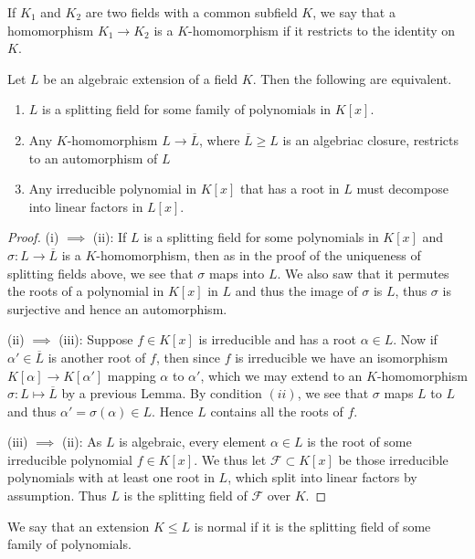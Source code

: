 \documentclass[twoside, a4paper, 10pt]{amsart}
\begin{document}
If $K_1$ and $K_2$ are two fields with a common subfield $K$, we say that a homomorphism $K_1 \to K_2$ is a $K$-homomorphism if it restricts to the identity on $K$.

\begin{thm} Let $L$ be an algebraic extension of a field $K$. Then the following are equivalent.

\begin{enumerate}
	\item $L$ is a splitting field for some family of polynomials in $K[x]$.
	\item Any $K$-homomorphism $L \to \overline{L}$, where $\overline{L} \geq L$ is an algebriac closure, restricts to an automorphism of $L$
	\item Any irreducible polynomial in $K[x]$ that has a root in $L$ must decompose into linear factors in $L[x]$.
\end{enumerate}

\end{thm}

\begin{proof} (i) $\implies$ (ii): If $L$ is a splitting field for some polynomials in $K[x]$ and $\sigma:L \to \overline{L}$ is a $K$-homomorphism, then as in the proof of the uniqueness of splitting fields above, we see that $\sigma$ maps into $L$. We also saw that it permutes the roots of a polynomial in $K[x]$ in $L$ and thus the image of $\sigma$ is $L$, thus $\sigma$ is surjective and hence an automorphism.

(ii) $\implies$ (iii): Suppose $f \in K[x]$ is irreducible and has a root $\alpha \in L$. Now if $\alpha' \in \overline{L}$ is another root of $f$, then since $f$ is irreducible we have an isomorphism $ K[\alpha] \to K[\alpha']$ mapping $\alpha$ to $\alpha'$, which we may extend to an $K$-homomorphism $\sigma:L \mapsto \overline{L}$ by a previous Lemma. By condition $(ii)$, we see that $\sigma$ maps $L$ to $L$ and thus $\alpha' = \sigma(\alpha) \in L$. Hence $L$ contains all the roots of $f$.

(iii) $\implies$ (ii): As $L$ is algebraic, every element $\alpha \in L$ is the root of some irreducible polynomial $f \in K[x]$. We thus let $\mathcal{F} \subset K[x]$ be those irreducible polynomials with at least one root in $L$, which split into linear factors by assumption. Thus $L$ is the splitting field of $\mathcal{F}$ over $K$.

\end{proof}

\begin{mydef} We say that an extension $K \leq L$ is normal if it is the splitting field of some family of polynomials.

\end{mydef}
\end{document}
